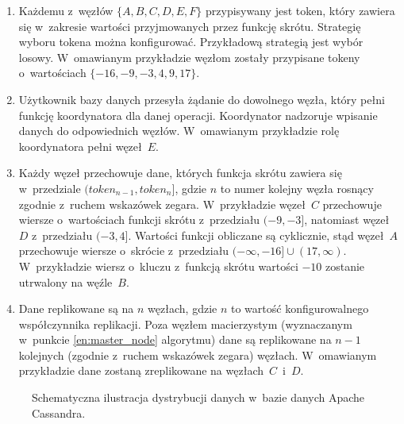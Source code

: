 \begin{enumerate}
	\item Każdemu z~węzłów $\{A, B, C, D, E, F\}$ przypisywany jest token, który zawiera się w~zakresie wartości przyjmowanych przez funkcję skrótu. Strategię wyboru tokena można konfigurować. Przykładową strategią jest wybór losowy. W~omawianym przykładzie węzłom zostały przypisane tokeny o~wartościach $\{-16, -9, -3, 4, 9, 17\}$.
	\item Użytkownik bazy danych przesyła żądanie do dowolnego węzła, który pełni funkcję koordynatora dla danej operacji. Koordynator nadzoruje wpisanie danych do odpowiednich węzłów. W~omawianym przykładzie rolę koordynatora pełni węzeł~$E$.
	\item \label{en:master_node} Każdy węzeł przechowuje dane, których funkcja skrótu zawiera się w~przedziale $(token_{n-1}, token_{n}]$, gdzie $n$ to numer kolejny węzła rosnący zgodnie z~ruchem wskazówek zegara. W~przykładzie węzeł~$C$ przechowuje wiersze o~wartościach funkcji skrótu z~przedziału $(-9, -3]$, natomiast węzeł~$D$ z~przedziału $(-3, 4]$. Wartości funkcji obliczane są cyklicznie, stąd węzeł~$A$ przechowuje wiersze o~skrócie z~przedziału $(-\infty, -16] \cup (17, \infty)$. W~przykładzie wiersz o~kluczu z~funkcją skrótu wartości $-10$ zostanie utrwalony na węźle~$B$.
	\item Dane replikowane są na $n$ węzłach, gdzie $n$ to wartość konfigurowalnego współczynnika replikacji. Poza węzłem macierzystym (wyznaczanym w~punkcie \ref{en:master_node} algorytmu) dane są replikowane na $n - 1$ kolejnych (zgodnie z~ruchem wskazówek zegara) węzłach. W~omawianym przykładzie dane zostaną zreplikowane na węzłach~$C$~i~$D$.
\end{enumerate}

\begin{figure}[ht!]
	\centering
	

	\caption{Schematyczna ilustracja dystrybucji danych w~bazie danych Apache Cassandra.}
	\label{fig:data_distribution}
\end{figure}

